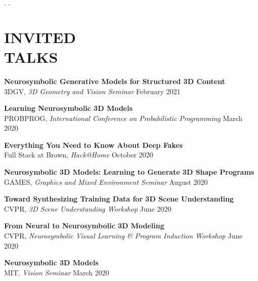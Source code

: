\documentclass[line,margin]{res}
\begin{document}
\begin{resume}
. 
.




\section{INVITED\\TALKS}

\newcommand{\talktitle}[1]{
	\textbf{#1}
}
\newcommand{\talk}[3]{
	#1, \emph{#2} \hfill #3
}

\talktitle{Neurosymbolic Generative Models for Structured 3D Content}\\
\talk
	{3DGV}
	{3D Geometry and Vision Seminar}
	{February 2021}

\talktitle{Learning Neurosymbolic 3D Models}\\
\talk
	{PROBPROG}
	{International Conference on Probabilistic Programming}
	{March 2020}

\talktitle{Everything You Need to Know About Deep Fakes}\\
\talk
	{Full Stack at Brown}
	{Hack@Home}
	{October 2020}

\talktitle{Neurosymbolic 3D Models: Learning to Generate 3D Shape Programs}\\
\talk
	{GAMES}
	{Graphics and Mixed Environment Seminar}
	{August 2020}

\talktitle{Toward Synthesizing Training Data for 3D Scene Understanding}\\
\talk
	{CVPR}
	{3D Scene Understanding Workshop}
	{June 2020}

\talktitle{From Neural to Neurosymbolic 3D Modeling}\\
\talk
	{CVPR}
	{Neurosymbolic Visual Learning \& Program Induction Workshop}
	{June 2020}

\talktitle{Neurosymbolic 3D Models}\\
\talk
	{MIT}
	{Vision Seminar}
	{March 2020}


\end{resume}
\end{document}
